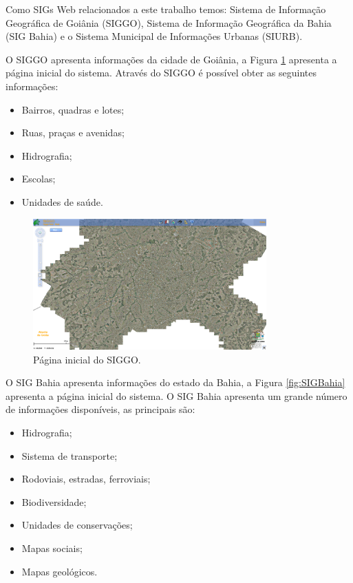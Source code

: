 Como SIGs Web relacionados a este trabalho temos: Sistema de Informação Geográfica de Goiânia (SIGGO), Sistema de Informação Geográfica da Bahia (SIG Bahia) e o Sistema Municipal de Informações Urbanas (SIURB).

\newpage

O SIGGO \cite{siggo} apresenta informações da cidade de Goiânia, a Figura \ref{fig:SIGGO} apresenta a página inicial do sistema. Através do SIGGO é possível obter as seguintes informações:

\begin{itemize}
\item Bairros, quadras e lotes;
\item Ruas, praças e avenidas;
\item Hidrografia;
\item Escolas;
\item Unidades de saúde.
\end{itemize}

\begin{figure}[h]
\centering
\includegraphics[width=0.80\textwidth]{./img/cap_IV/30-SIGGO}
\caption{Página inicial do SIGGO.}
\label{fig:SIGGO}
\end{figure}

O SIG Bahia \cite{sigbahia} apresenta informações do estado da Bahia, a Figura \ref{fig:SIGBahia} apresenta a página inicial do sistema. O SIG Bahia apresenta um grande número de informações disponíveis, as principais são:

\begin{itemize}
\item Hidrografia;
\item Sistema de transporte;
\item Rodoviais, estradas, ferroviais;
\item Biodiversidade;
\item Unidades de conservações;
\item Mapas sociais;
\item Mapas geológicos.
\end{itemize}

